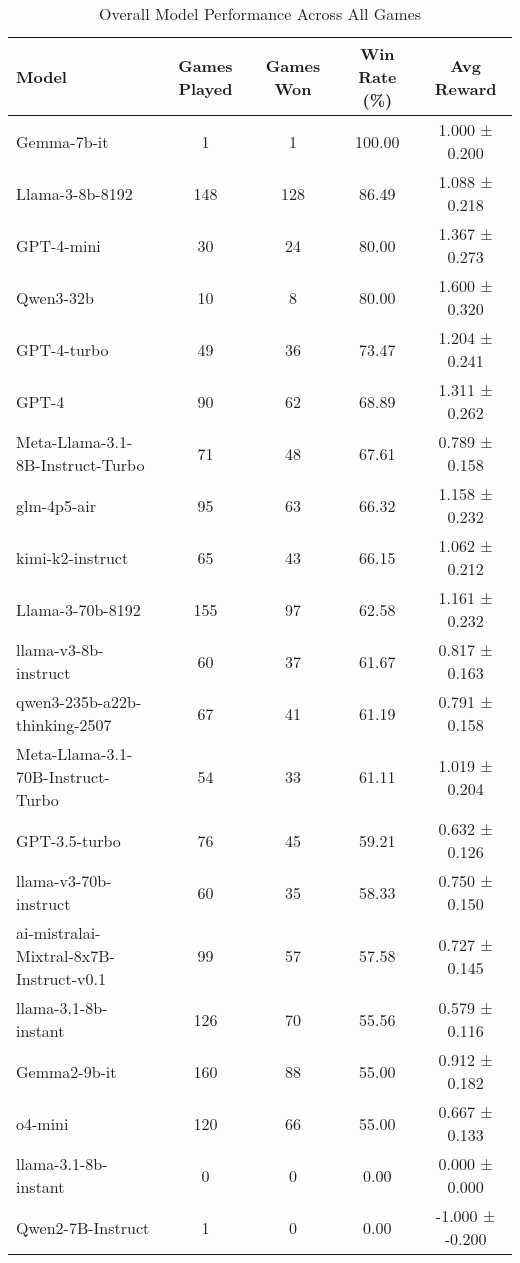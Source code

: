 \begin{table}[htbp]
\centering
\caption{Overall Model Performance Across All Games}
\begin{tabular}{lcccc}
\toprule
Model & Games Played & Games Won & Win Rate (\%) & Avg Reward \\
\midrule
Gemma-7b-it & 1 & 1 & 100.00 & 1.000 ± 0.200 \\
Llama-3-8b-8192 & 148 & 128 & 86.49 & 1.088 ± 0.218 \\
GPT-4-mini & 30 & 24 & 80.00 & 1.367 ± 0.273 \\
Qwen3-32b & 10 & 8 & 80.00 & 1.600 ± 0.320 \\
GPT-4-turbo & 49 & 36 & 73.47 & 1.204 ± 0.241 \\
GPT-4 & 90 & 62 & 68.89 & 1.311 ± 0.262 \\
Meta-Llama-3.1-8B-Instruct-Turbo & 71 & 48 & 67.61 & 0.789 ± 0.158 \\
glm-4p5-air & 95 & 63 & 66.32 & 1.158 ± 0.232 \\
kimi-k2-instruct & 65 & 43 & 66.15 & 1.062 ± 0.212 \\
Llama-3-70b-8192 & 155 & 97 & 62.58 & 1.161 ± 0.232 \\
llama-v3-8b-instruct & 60 & 37 & 61.67 & 0.817 ± 0.163 \\
qwen3-235b-a22b-thinking-2507 & 67 & 41 & 61.19 & 0.791 ± 0.158 \\
Meta-Llama-3.1-70B-Instruct-Turbo & 54 & 33 & 61.11 & 1.019 ± 0.204 \\
GPT-3.5-turbo & 76 & 45 & 59.21 & 0.632 ± 0.126 \\
llama-v3-70b-instruct & 60 & 35 & 58.33 & 0.750 ± 0.150 \\
ai-mistralai-Mixtral-8x7B-Instruct-v0.1 & 99 & 57 & 57.58 & 0.727 ± 0.145 \\
llama-3.1-8b-instant & 126 & 70 & 55.56 & 0.579 ± 0.116 \\
Gemma2-9b-it & 160 & 88 & 55.00 & 0.912 ± 0.182 \\
o4-mini & 120 & 66 & 55.00 & 0.667 ± 0.133 \\
llama-3.1-8b-instant & 0 & 0 & 0.00 & 0.000 ± 0.000 \\
Qwen2-7B-Instruct & 1 & 0 & 0.00 & -1.000 ± -0.200 \\
\bottomrule
\end{tabular}
\end{table}
